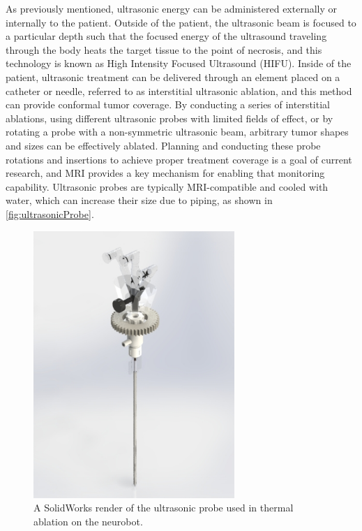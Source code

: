 \documentclass[12pt]{report}
\begin{document}
As previously mentioned, ultrasonic energy can be administered externally or internally to the patient. Outside of the patient, the ultrasonic beam is focused to a particular depth such that the focused energy of the ultrasound traveling through the body heats the target tissue to the point of necrosis, and this technology is known as High Intensity Focused Ultrasound (HIFU). \cite{hifu} Inside of the patient, ultrasonic treatment can be delivered through an element placed on a catheter or needle, referred to as interstitial ultrasonic ablation, and this method can provide conformal tumor coverage. \cite{interstitialAblation} By conducting a series of interstitial ablations, using different ultrasonic probes with limited fields of effect, or by rotating a probe with a non-symmetric ultrasonic beam, arbitrary tumor shapes and sizes can be effectively ablated. Planning and conducting these probe rotations and insertions to achieve proper treatment coverage is a goal of current research, and MRI provides a key mechanism for enabling that monitoring capability. Ultrasonic probes are typically MRI-compatible and cooled with water, which can increase their size due to piping, as shown in \autoref{fig:ultrasonicProbe}.

\begin{figure}[thpb]
	\centering
	\includegraphics[width=3in]{images/ablation_probe_render.jpg}
    \caption{A SolidWorks render of the ultrasonic probe used in thermal ablation on the neurobot.}
    \label{fig:ultrasonicProbe}
\end{figure}
\end{document}

